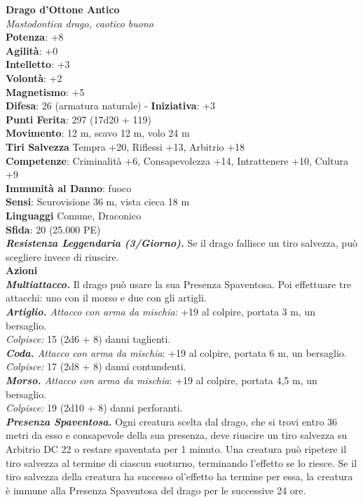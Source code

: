 \begin{multicols}{2}
\medskip\textbf{Drago d'Ottone Antico}\\
\emph{Mastodontica drago, caotico buono}\\
\textbf{Potenza}: +8\\
\textbf{Agilità}: +0\\
\textbf{Intelletto}: +3\\
\textbf{Volontà}: +2\\
\textbf{Magnetismo}: +5\\
\textbf{Difesa}: 26 (armatura naturale) - \textbf{Iniziativa}: +3\\
\textbf{Punti Ferita}: 297 (17d20 + 119)\\
\textbf{Movimento}: 12 m, scavo 12 m, volo 24 m\\
\textbf{Tiri Salvezza} Tempra +20, Riflessi +13, Arbitrio +18\\
\textbf{Competenze}: Criminalità +6, Consapevolezza +14, Intrattenere +10, Cultura +9\\
\textbf{Immunità al Danno}: fuoco\\
\textbf{Sensi}: Scurovisione 36 m, vista cieca 18 m\\
\textbf{Linguaggi} Comune, Draconico\\
\textbf{Sfida}: 20 (25.000 PE)\smallskip\\
\emph{\textbf{Resistenza Leggendaria (3/Giorno).}} Se il drago fallisce un tiro salvezza, può scegliere invece di riuscire.\\
\smallskip\textbf{Azioni}\\
\emph{\textbf{Multiattacco.}} Il drago può usare la sua Presenza Spaventosa. Poi effettuare tre attacchi: uno con il morso e due con gli artigli.\\
\emph{\textbf{Artiglio.} Attacco con arma da mischia}: +19 al colpire, portata 3 m, un bersaglio.\\
\emph{Colpisce:} 15 (2d6 + 8) danni taglienti.\\
\emph{\textbf{Coda.} Attacco con arma da mischia}: +19 al colpire, portata 6 m, un bersaglio.\\
\emph{Colpisce:} 17 (2d8 + 8) danni contundenti.\\
\emph{\textbf{Morso.} Attacco con arma da mischia}: +19 al colpire, portata 4,5 m, un bersaglio.\\
\emph{Colpisce:} 19 (2d10 + 8) danni perforanti.\\
\emph{\textbf{Presenza Spaventosa.}} Ogni creatura scelta dal drago, che si trovi entro 36 metri da esso e consapevole della sua presenza, deve riuscire un tiro salvezza su Arbitrio DC  22 o restare spaventata per 1 minuto. Una creatura può ripetere il tiro salvezza al termine di ciascun suoturno,  terminando l'effetto se lo riesce. Se il tiro salvezza della creatura ha successo ol'effetto ha termine per essa, la creatura è  immune alla Presenza Spaventosa del drago per le successive 24 ore.\\

\end{multicols}
